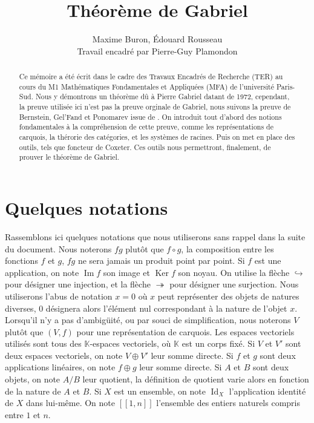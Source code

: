 \documentclass[a4paper,10pt]{article}
\title{Théorème de Gabriel}
\author{Maxime Buron, Édouard Rousseau\\
Travail encadré par Pierre-Guy Plamondon}
\DeclareMathOperator{\Ker}{Ker}
\DeclareMathOperator{\Id}{Id}
\DeclareMathOperator{\Img}{Im}
\begin{document}
\maketitle

\begin{abstract} 
	Ce mémoire a été écrit dans le cadre des Travaux Encadrés de Recherche (TER) au cours du M1 Mathématiques Fondamentales et Appliquées (MFA) de l'université Paris-Sud. Nous y démontrons un théorème dû à Pierre Gabriel datant de 1972, cependant, la preuve utilisée ici n'est pas la preuve orginale de Gabriel, nous suivons la preuve de Bernstein, Gel'Fand et Ponomarev issue de \cite{BGP72}. On introduit tout d'abord des notions fondamentales à la compréhension de cette preuve, comme les représentations de carquois, la thérorie des catégories, et les systèmes de racines. Puis on met en place des outils, tels que foncteur de Coxeter. Ces outils nous permettront, finalement, de prouver le théorème de Gabriel.
\end{abstract}

\tableofcontents

\clearpage
\section*{Quelques notations}
Rassemblons ici quelques notations que nous utiliserons sans rappel dans la suite du document. Nous noterons $fg$ plutôt que $f\circ g$, la composition entre les fonctions $f$ et $g$, $fg$ ne sera jamais un produit point par point. Si $f$ est une application, on note $\Img f$ son image et $\Ker f$ son noyau. On utilise la flèche $\hookrightarrow$ pour désigner une injection, et la flèche $\twoheadrightarrow$ pour désigner une surjection. Nous utiliserons l'abus de notation $x=0$ où $x$ peut représenter des objets de natures diverses, $0$ désignera alors l'élément nul correspondant à la nature de l'objet $x$. Lorsqu'il n'y a pas d'ambigüité, ou par souci de simplification, nous noterons $V$ plutôt que $(V,f)$ pour une représentation de carquois. Les espaces vectoriels utilisés sont tous des $\mathbb K$-espaces vectoriels, où $\mathbb K$ est un corps fixé. Si $V$ et $V'$ sont deux espaces vectoriels, on note $V\oplus V'$ leur somme directe. Si $f$ et $g$ sont deux applications linéaires, on note $f\oplus g$ leur somme directe. Si $A$ et $B$ sont deux objets, on note $A/B$ leur quotient, la définition de quotient varie alors en fonction de la nature de $A$ et $B$. Si $X$ est un ensemble, on note $\Id_X$ l'application identité de $X$ dans lui-même.  On note $[\![1,n]\!]$ l'ensemble des entiers naturels compris entre $1$ et $n$. 
        
\end{document}

